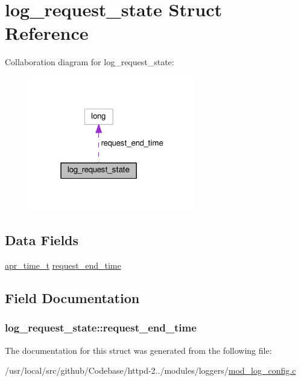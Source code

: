 \hypertarget{structlog__request__state}{}\section{log\+\_\+request\+\_\+state Struct Reference}
\label{structlog__request__state}


Collaboration diagram for log\+\_\+request\+\_\+state\+:
\nopagebreak
\begin{figure}[H]
\begin{center}
\leavevmode
\includegraphics[width=208pt]{structlog__request__state__coll__graph}
\end{center}
\end{figure}
\subsection*{Data Fields}
\begin{DoxyCompactItemize}
\item 
\hyperlink{group__apr__time_gadb4bde16055748190eae190c55aa02bb}{apr\+\_\+time\+\_\+t} \hyperlink{structlog__request__state_a48483aa1d5359cfd89decb1cd7ebd021}{request\+\_\+end\+\_\+time}
\end{DoxyCompactItemize}


\subsection{Field Documentation}
\subsubsection[{\texorpdfstring{request\+\_\+end\+\_\+time}{request_end_time}}]{ log\+\_\+request\+\_\+state\+::request\+\_\+end\+\_\+time}\hypertarget{structlog__request__state_a48483aa1d5359cfd89decb1cd7ebd021}{}\label{structlog__request__state_a48483aa1d5359cfd89decb1cd7ebd021}


The documentation for this struct was generated from the following file\+:\begin{DoxyCompactItemize}
\item 
/usr/local/src/github/\+Codebase/httpd-\/2../modules/loggers/\hyperlink{mod__log__config_8c}{mod\+\_\+log\+\_\+config.\+c}\end{DoxyCompactItemize}
